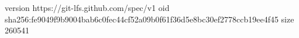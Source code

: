 version https://git-lfs.github.com/spec/v1
oid sha256:fe9049f9b9004bab6c0fec44cf52a09b0f61f36d5e8bc30ef2778ccb19ee4f45
size 260541
